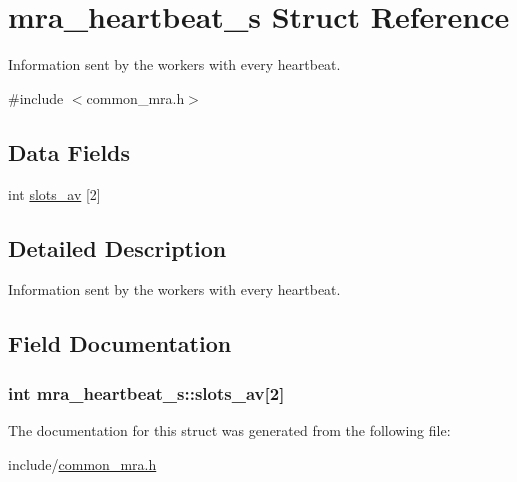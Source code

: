 \hypertarget{structmra__heartbeat__s}{\section{mra\-\_\-heartbeat\-\_\-s \-Struct \-Reference}
\label{structmra__heartbeat__s}
}


\-Information sent by the workers with every heartbeat.  




{\ttfamily \#include $<$common\-\_\-mra.\-h$>$}

\subsection*{\-Data \-Fields}
\begin{DoxyCompactItemize}
\item 
int \hyperlink{structmra__heartbeat__s_a4807e7c902185697b22776045965e1a6}{slots\-\_\-av} \mbox{[}2\mbox{]}
\end{DoxyCompactItemize}


\subsection{\-Detailed \-Description}
\-Information sent by the workers with every heartbeat. 

\subsection{\-Field \-Documentation}
\hypertarget{structmra__heartbeat__s_a4807e7c902185697b22776045965e1a6}{
\subsubsection[{slots\-\_\-av}]{\setlength{\rightskip}{0pt plus 5cm}int {\bf mra\-\_\-heartbeat\-\_\-s\-::slots\-\_\-av}\mbox{[}2\mbox{]}}}\label{structmra__heartbeat__s_a4807e7c902185697b22776045965e1a6}


\-The documentation for this struct was generated from the following file\-:\begin{DoxyCompactItemize}
\item 
include/\hyperlink{common__mra_8h}{common\-\_\-mra.\-h}\end{DoxyCompactItemize}
